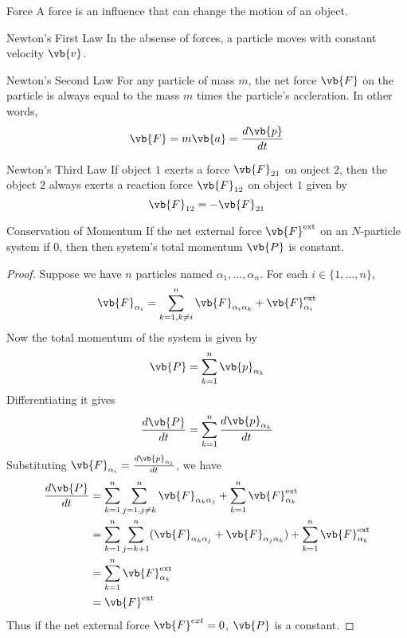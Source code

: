 \documentclass[a4paper]{article}
\begin{document}
\begin{defn}{Force}{} A force is an influence that can change the motion of an object. 
\end{defn}

\begin{axm}{Newton's First Law}{} In the absense of forces, a particle moves with constant velocity $\vb{v}$. 
\end{axm}

\begin{axm}{Newton's Second Law}{} For any particle of mass $m$, the net force $\vb{F}$ on the particle is always equal to the mass $m$ times the particle's accleration. In other words, $$\vb{F}=m\vb{a}=\frac{d\vb{p}}{dt}$$
\end{axm}

\begin{axm}{Newton's Third Law}{} If object $1$ exerts a force $\vb{F}_{21}$ on onject $2$, then the object $2$ always exerts a reaction force $\vb{F}_{12}$ on object $1$ given by $$\vb{F}_{12}=-\vb{F}_{21}$$
\end{axm}

\begin{thm}{Conservation of Momentum}{} If the net external force $\vb{F}^\text{ext}$ on an $N$-particle system if $0$, then then system's total momentum $\vb{P}$ is constant. \tcbline
\begin{proof} Suppose we have $n$ particles named $\alpha_1,\dots,\alpha_n$. For each $i\in\{1,\dots,n\}$, $$\vb{F}_{\alpha_i}=\sum_{k=1, k\neq i}^n\vb{F}_{\alpha_i\alpha_k}+\vb{F}_{\alpha_i}^\text{ext}$$ Now the total momentum of the system is given by $$\vb{P}=\sum_{k=1}^n\vb{p}_{\alpha_k}$$ Differentiating it gives $$\frac{d\vb{P}}{dt}=\sum_{k=1}^n\frac{d\vb{p}_{\alpha_k}}{dt}$$ Substituting $\vb{F}_{\alpha_i}=\frac{d\vb{p}_{\alpha_i}}{dt}$, we have 
\begin{align*}
\frac{d\vb{P}}{dt}&=\sum_{k=1}^n\sum_{j=1,j\neq k}^n\vb{F}_{\alpha_k\alpha_j}+\sum_{k=1}^n\vb{F}_{\alpha_k}^\text{ext}\\
&=\sum_{k=1}^n\sum_{j=k+1}^n(\vb{F}_{\alpha_k\alpha_j}+\vb{F}_{\alpha_j\alpha_k})+\sum_{k=1}^n\vb{F}_{\alpha_k}^\text{ext}\\
&=\sum_{k=1}^n\vb{F}_{\alpha_k}^\text{ext}\\
&=\vb{F}^\text{ext}
\end{align*} Thus if the net external force $\vb{F}^{ext}=0$, $\vb{P}$ is a constant. 
\end{proof}
\end{thm}
\end{document}

